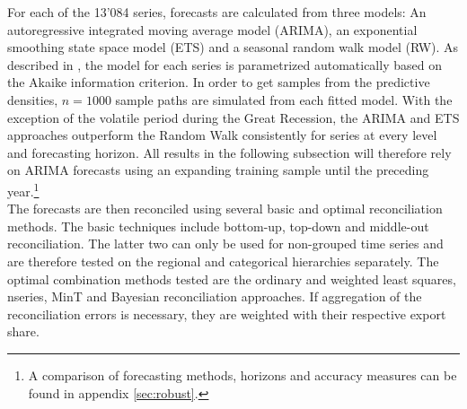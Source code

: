 \documentclass[a4paper,fleqn,11pt]{article}
\begin{document}
For each of the 13'084 series, forecasts are calculated from three models: An autoregressive integrated moving average model (ARIMA), an exponential smoothing state space model (ETS) and a seasonal random walk model (RW). As described in \cite{Hyndman2008}, the model for each series is parametrized automatically based on the Akaike information criterion. In order to get samples from the predictive densities, $n = 1000$ sample paths are simulated from each fitted model. With the exception of the volatile period during the Great Recession, the ARIMA and ETS approaches outperform the Random Walk consistently for series at every level and forecasting horizon. All results in the following subsection will therefore rely on ARIMA forecasts using an expanding training sample until the preceding year.\footnote{A comparison of forecasting methods, horizons and accuracy measures can be found in appendix \ref{sec:robust}.}\\

The forecasts are then reconciled using several basic and optimal reconciliation methods. The basic techniques include bottom-up, top-down and middle-out reconciliation. The latter two can only be used for non-grouped time series and are therefore tested on the regional and categorical hierarchies separately. The optimal combination methods tested are the ordinary and weighted least squares, nseries, MinT and Bayesian reconciliation approaches. If aggregation of the reconciliation errors is necessary, they are weighted with their respective export share.\\


\clearpage
\end{document}
